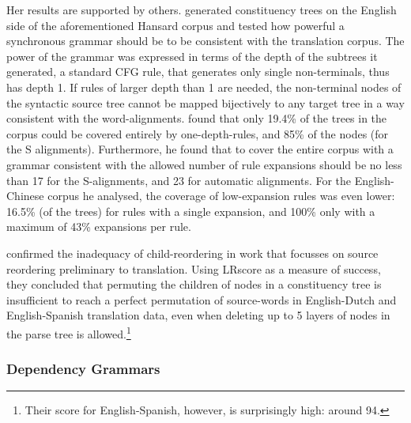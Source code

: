 Her results are supported by others. \cite{galley2004s} generated constituency trees on the English side of the aforementioned Hansard corpus and tested how powerful a synchronous grammar should be to be consistent with the translation corpus. The power of the grammar was expressed in terms of the depth of the subtrees it generated, a standard CFG rule, that generates only single non-terminals, thus has depth 1. If rules of larger depth than 1 are needed, the non-terminal nodes of the syntactic source tree cannot be mapped bijectively to any target tree in a way consistent with the word-alignments. \citeauthor{galley2004s} found that only 19.4\% of the trees in the corpus could be covered entirely by one-depth-rules, and 85\% of the nodes (for the S alignments). Furthermore, he found that to cover the entire corpus with a grammar consistent with the allowed number of rule expansions should be no less than 17 for the S-alignments, and 23 for automatic alignments. For the English-Chinese corpus he analysed, the coverage of low-expansion rules was even lower: 16.5\% (of the trees) for rules with a single expansion, and 100\% only with a maximum of 43\% expansions per rule.

\cite{khalilov2012statistical} confirmed the inadequacy of child-reordering in work that focusses on source reordering preliminary to translation. Using LRscore \citep{birch2010lrscore} as a measure of success, they concluded that permuting the children of nodes in a constituency tree is insufficient to reach a perfect permutation of source-words in English-Dutch and English-Spanish translation data, even when deleting up to 5 layers of nodes in the parse tree is allowed.\footnote{Their score for English-Spanish, however, is surprisingly high: around 94.}


\subsubsection{Dependency Grammars}

